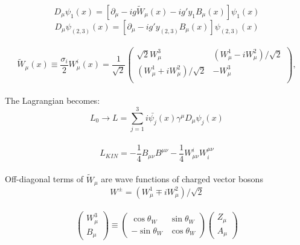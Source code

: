 \begin{equation}
D_\mu \psi_1(x) = [\partial_\mu - i g {\tilde{W}}_\mu(x) - i g' y_1 B_\mu(x) ] \psi_1(x) 
\end{equation}
\begin{equation}
D_\mu \psi_{(2,3)}(x) = [\partial_\mu - i g' y_{(2,3)} B_\mu(x) ] \psi_{(2,3)}(x) 
\end{equation}
\\ 
\begin{equation}
  {\tilde{W}}_\mu(x) \equiv \frac{\sigma_i}{2} W_\mu^i(x) = \frac{1}{\sqrt{2}} 
  \begin{pmatrix}
  \sqrt{2} W_\mu^3 & (W_\mu^1 - i W_\mu^2)/{\sqrt{2}}\\
  (W_\mu^1 + i W_\mu^2)/{\sqrt{2}} & -W_\mu^3\\
  \end{pmatrix} , 
\end{equation}
\\
The Lagrangian becomes:\\
\begin{equation}\label{eq:L_free_covariant}
L_0 \rightarrow L = \sum_{j=1}^{3} i \bar{\psi_j}(x) \gamma^\mu D_\mu \psi_j(x) 
\end{equation}
\\
\begin{equation} \label{eq:L_gauge_kin}
L_{KIN}=-\frac{1}{4}B_{\mu\nu}B^{\mu\nu}-\frac{1}{4}W_{\mu\nu}^i W^{\mu\nu}_i
\end{equation}
\\
Off-diagonal terms of ${\tilde{W}}_\mu$ are wave functions of charged vector bosons 
\begin{equation}\label{eq:Wpm_vs_W12}
W^{\pm}=(W_\mu^1 \mp i W_\mu^2)/{\sqrt{2}}
\end{equation} 
 \\
\begin{equation}\label{eq:W3B_vs_ZA}
  \begin{pmatrix} W_\mu^3 \\ B_\mu \end{pmatrix} \equiv
  \begin{pmatrix} \cos \theta_W & \sin \theta_W \\ -\sin \theta_W & \cos \theta_W \end{pmatrix}
  \begin{pmatrix} Z_\mu \\ A_\mu \end{pmatrix}
\end{equation} 
